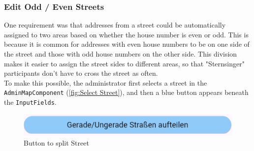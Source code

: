 \subsubsection{Edit Odd / Even Streets}
One requirement was that addresses from a street could be automatically assigned to two areas based on whether the house number is even or odd. This is because it is common for addresses with even house numbers to be on one side of the street and those with odd house numbers on the other side. This division makes it easier to assign the street sides to different areas, so that "Sternsinger" participants don't have to cross the street as often.\\ 
To make this possible, the administrator first selects a street in the \texttt{AdminMapComponent} (\ref{fig:Select Street}), and then a blue button appears beneath the \texttt{InputFields}.
\begin{figure}[H]
    \centering
    \includegraphics[width=0.6\linewidth]{images/AdminPanel/splitStreetButton.png}
    \caption{Button to split Street}
\end{figure}

